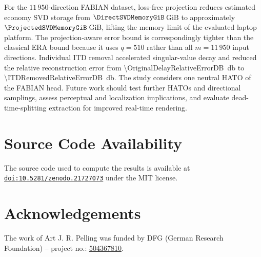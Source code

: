 \documentclass[non-peer-review]{fa2026}
\begin{document}
For the \(11\,950\)-direction FABIAN dataset, loss-free projection reduces estimated economy SVD storage from \(\DirectSVDMemoryGiB\)\,GiB to approximately
\(\ProjectedSVDMemoryGiB\)\,GiB, lifting the memory limit of the evaluated laptop platform. The projection-aware error
bound is correspondingly tighter than the classical \acs{ERA} bound because it uses \(q=510\) rather than all \(m=11\,950\) input
directions. Individual \ac{ITD} removal accelerated singular-value decay and reduced the relative
reconstruction error from \SI{\OriginalDelayRelativeErrorDB}{\decibel} to \SI{\ITDRemovedRelativeErrorDB}{\decibel}.
The study considers one neutral \ac{HATO} of the FABIAN head. Future work should test further \acp{HATO} and directional
samplings, assess perceptual and localization implications, and evaluate dead-time-splitting extraction
\cite{pelling2026} for improved real-time rendering.

\section*{Source Code Availability}
The source code used to compute the results is available at
\href{https://doi.org/10.5281/zenodo.21727073}{\texttt{doi:10.5281/zenodo.21727073}} under the MIT license.
%
\section*{Acknowledgements}
The work of Art J. R. Pelling was funded by DFG (German Research Foundation) – project no.:
\href{https://gepris.dfg.de/gepris/projekt/504367810?language=en}{504367810}.
%
\begingroup
\printbibliography[title={References}] \endgroup
%
\end{document}
